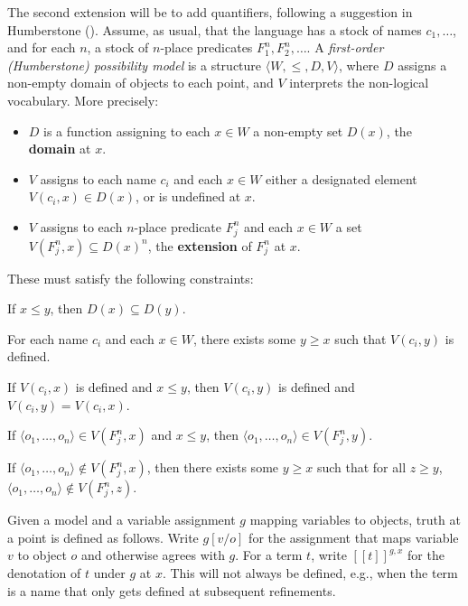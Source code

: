 \documentclass[
  11pt,
  letterpaper,
  DIV=11,
  numbers=noendperiod,
  twoside]{scrartcl}
\providecommand{\tightlist}{%
  \setlength{\itemsep}{0pt}\setlength{\parskip}{0pt}}
\newcommand{\llbracket}{[\![}
\newcommand{\rrbracket}{]\!]}
\begin{document}
The second extension will be to add quantifiers, following a suggestion
in Humberstone (). Assume, as
usual, that the language has a stock of names \(c_1, \dots\), and for
each \(n\), a stock of \(n\)-place predicates \(F^n_1, F^n_2, \dots\). A
\emph{first-order (Humberstone) possibility model} is a structure
\(\langle W, \leqslant, D, V \rangle\), where \(D\) assigns a non-empty
domain of objects to each point, and \(V\) interprets the non-logical
vocabulary. More precisely:

\begin{itemize}
\tightlist
\item
  \(D\) is a function assigning to each \(x \in W\) a non-empty set
  \(D(x)\), the \textbf{domain} at \(x\).
\item
  \(V\) assigns to each name \(c_i\) and each \(x \in W\) either a
  designated element \(V(c_i, x) \in D(x)\), or is undefined at \(x\).
\item
  \(V\) assigns to each \(n\)-place predicate \(F^n_j\) and each
  \(x \in W\) a set \(V(F^n_j, x) \subseteq D(x)^n\), the
  \textbf{extension} of \(F^n_j\) at \(x\).
\end{itemize}

These must satisfy the following constraints:

\begin{description}
\tightlist
\item[Domain monotonicity]
If \(x \leqslant y\), then \(D(x) \subseteq D(y)\).
\item[Name coverage]
For each name \(c_i\) and each \(x \in W\), there exists some
\(y \geqslant x\) such that \(V(c_i, y)\) is defined.
\item[Persistence for names]
If \(V(c_i, x)\) is defined and \(x \leqslant y\), then \(V(c_i, y)\) is
defined and \(V(c_i, y) = V(c_i, x)\).
\item[Persistence for predicate extensions]
If \(\langle o_1, \dots, o_n \rangle \in V(F^n_j, x)\) and
\(x \leqslant y\), then
\(\langle o_1, \dots, o_n \rangle \in V(F^n_j, y)\).
\item[Refinability for predicate extensions]
If \(\langle o_1, \dots, o_n \rangle \notin V(F^n_j, x)\), then there
exists some \(y \geqslant x\) such that for all \(z \geqslant y\),
\(\langle o_1, \dots, o_n \rangle \notin V(F^n_j, z)\).
\end{description}

Given a model and a variable assignment \(g\) mapping variables to
objects, truth at a point is defined as follows. Write \(g[v/o]\) for
the assignment that maps variable \(v\) to object \(o\) and otherwise
agrees with \(g\). For a term \(t\), write
\(\llbracket t \rrbracket^{g,x}\) for the denotation of \(t\) under
\(g\) at \(x\). This will not always be defined, e.g., when the term is
a name that only gets defined at subsequent refinements.
\end{document}
